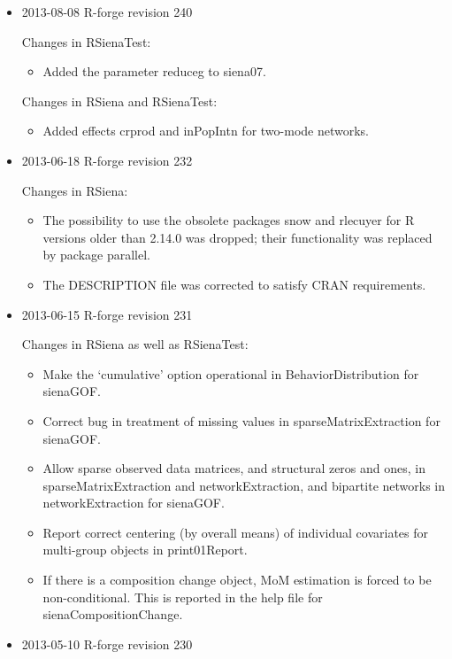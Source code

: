 \documentclass[a4paper,fleqn,11pt]{article}
\newcommand{\+}{\, + \,}
\newcommand{\sfn}[1]{\textsf{#1}}
\begin{document}
\begin{small}
\begin{itemize}
\item 2013-08-08 R-forge revision 240

Changes in \textsf{RSienaTest}:
  \begin{itemize}
  \item Added the parameter reduceg to \textsf{siena07}.
  \end{itemize}

Changes in \textsf{RSiena} and \textsf{RSienaTest}:
  \begin{itemize}
  \item Added effects crprod and inPopIntn for two-mode networks.
  \end{itemize}

\item 2013-06-18 R-forge revision 232

Changes in RSiena:
  \begin{itemize}
  \item The possibility to use the obsolete packages \sfn{snow} and
     \sfn{rlecuyer} for R versions older than 2.14.0 was dropped;
     their functionality was replaced by package \sfn{parallel}.
   \item The DESCRIPTION file was corrected to satisfy CRAN requirements.
  \end{itemize}

\item 2013-06-15 R-forge revision 231

Changes in \textsf{RSiena} as well as \textsf{RSienaTest}:
  \begin{itemize}
  \item
   Make the `cumulative' option operational in \sfn{BehaviorDistribution}
   for \sfn{sienaGOF}.
  \item
   Correct bug in treatment of missing values in  \sfn{sparseMatrixExtraction}
   for  \sfn{sienaGOF}.
  \item
    Allow sparse observed data matrices, and structural zeros and ones, in
      \sfn{sparseMatrixExtraction} and  \sfn{networkExtraction},
     and bipartite networks in  \sfn{networkExtraction} for  \sfn{sienaGOF}.
  \item
   Report correct centering (by overall means) of individual
     covariates for multi-group objects in  \sfn{print01Report}.
  \item
   If there is a composition change object, MoM estimation is forced
     to be non-conditional. This is reported in the help file
     for  \sfn{sienaCompositionChange}.
  \end{itemize}
\item 2013-05-10 R-forge revision 230


\end{itemize}
\end{small}
\end{document}
